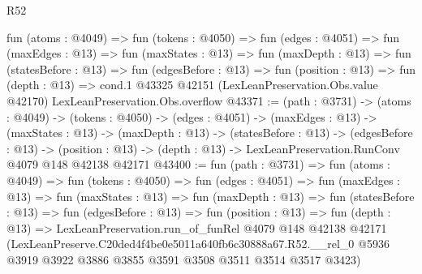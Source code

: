 \begin{lexlean}{R52}
\begin{coremodule}
  fun (atoms : @4049) =>
  fun (tokens : @4050) =>
  fun (edges : @4051) =>
  fun (maxEdges : @13) =>
  fun (maxStates : @13) =>
  fun (maxDepth : @13) =>
  fun (statesBefore : @13) =>
  fun (edgesBefore : @13) =>
  fun (position : @13) =>
  fun (depth : @13) =>
  cond.{1} @43325 @42151 (LexLeanPreservation.Obs.value @42170) LexLeanPreservation.Obs.overflow
@43371 := (path : @3731) ->
  (atoms : @4049) ->
  (tokens : @4050) ->
  (edges : @4051) ->
  (maxEdges : @13) ->
  (maxStates : @13) ->
  (maxDepth : @13) ->
  (statesBefore : @13) ->
  (edgesBefore : @13) ->
  (position : @13) -> (depth : @13) -> LexLeanPreservation.RunConv @4079 @148 @42138 @42171
@43400 := fun (path : @3731) =>
  fun (atoms : @4049) =>
  fun (tokens : @4050) =>
  fun (edges : @4051) =>
  fun (maxEdges : @13) =>
  fun (maxStates : @13) =>
  fun (maxDepth : @13) =>
  fun (statesBefore : @13) =>
  fun (edgesBefore : @13) =>
  fun (position : @13) =>
  fun (depth : @13) =>
  LexLeanPreservation.run_of_funRel
    @4079
    @148
    @42138
    @42171
    (LexLeanPreserve.C20ded4f4be0e5011a640fb6c30888a67.R52.__rel_0
      @5936
      @3919
      @3922
      @3886
      @3855
      @3591
      @3508
      @3511
      @3514
      @3517
      @3423)
\end{coremodule}
\end{lexlean}
